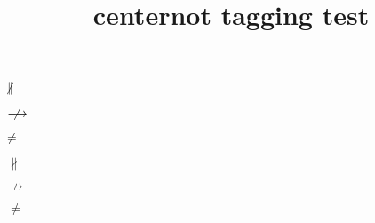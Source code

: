 \documentclass{article}
\title{centernot tagging test}
\begin{document}
$\centernot\parallel$

$\centernot\longrightarrow$

$\centernot =$

$\not\parallel$

$\not\longrightarrow$

$\not =$
\end{document}
